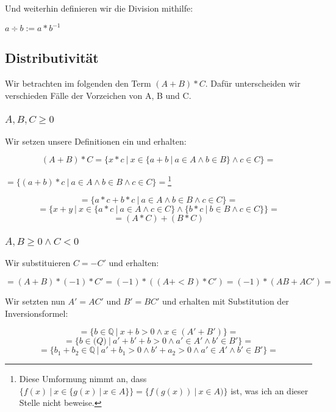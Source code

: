 \documentclass[12pt]{article}
\begin{document}
    Und weiterhin definieren wir die Division mithilfe:

    $a \div b := a * b^{-1}$

    \subsection{Distributivität}

    Wir betrachten im folgenden den Term $(A + B) * C$.
    Dafür unterscheiden wir verschieden Fälle der Vorzeichen von A, B und C.

    \subsubsection{$A, B, C \ge 0$}

    Wir setzen unsere Definitionen ein und erhalten:

    \[
        (A + B) * C = \{x * c \mspace{4mu} | \mspace{4mu} x \in \{a + b \mspace{4mu} | \mspace{4mu} a \in A \land b \in B\} \land c \in C\} =
    \]
    \begin{center}
        $ = \{(a + b) * c \mspace{4mu} | \mspace{4mu} a \in A \land b \in B \land c \in C\} = $\footnote{
        Diese Umformung nimmt an, dass $\{f(x) \mspace{4mu} | \mspace{4mu} x \in \{g(x) \mspace{4mu} | \mspace{4mu} x \in A\}\} =
        \{f(g(x)) \mspace{4mu} | \mspace{4mu} x \in A)\}$ ist,
        was ich an dieser Stelle nicht beweise.
    }\end{center}
    \[
        = \{a * c + b * c \mspace{4mu} | \mspace{4mu} a \in A \land b \in B \land c \in C\} =
    \]
    \[
        = \{x + y \mspace{4mu} | \mspace{4mu} x \in \{a * c \mspace{4mu} | \mspace{4mu} a \in A \land c \in C\} \land
        \{b * c \mspace{4mu} | \mspace{4mu} b \in B \land c \in C\}\} =
    \]
    \[
        = (A * C) + (B * C)
    \]

    \subsubsection{$A, B \ge 0 \land C < 0$}

    Wir substituieren $C = -C'$ und erhalten:

    \[
        = (A + B) * (-1) * C' = (-1) * ((A +< B) * C') = (-1) * (AB + AC') =
    \]

    Wir setzten nun $A' = AC'$ und $B' = BC'$ und erhalten mit Substitution der Inversionsformel:

    \[
        = \{b \in \mathbb{Q} \mspace{4mu} | \mspace{4mu} x + b > 0 \land x \in (A' + B')\} =
    \]
    \[
        = \{b \in \mathbb(Q) \mspace{4mu} | \mspace{4mu} a' + b' + b > 0 \land a' \in A' \land b' \in B'\} =
    \]
    \[
        = \{b_1 + b_2 \in \mathbb{Q} \mspace{4mu} | \mspace{4mu} a' + b_1 > 0 \land b' + a_2 > 0 \land a' \in A' \land b' \in B'\} =
    \]
\end{document}
